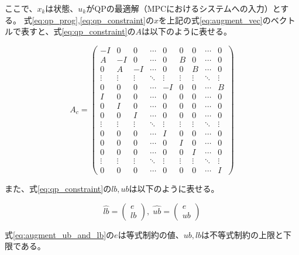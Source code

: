 ここで、$x_{k}$は状態、$u_{k}$がQPの最適解（MPCにおけるシステムへの入力）とする。
式\eqref{eq:qp_prog},\eqref{eq:qp_constraint}の$x$を上記の式\eqref{eq:augment_vec}のベクトルで表すと、式\eqref{eq:qp_constraint}の$A$は以下のように表せる。

\begin{equation}
  A_{c} =
  \left(
  \begin{array}{ccccc|cccc}
      -I & 0 & 0 & \cdots & 0 & 0 & 0 & \cdots & 0 \\ A & -I & 0 & \cdots & 0 & B & 0 & \cdots & 0 \\ 0 & A & -I & \cdots & 0 & 0 & B & \cdots & 0\\ \vdots & \vdots & \vdots & \ddots & \vdots & \vdots & \vdots & \ddots & \vdots \\ 0 & 0 & 0 & \cdots & -I & 0 & 0 & \cdots & B\\ \hline I & 0 & 0 & \cdots & 0 & 0 & 0 & \cdots & 0\\ 0 & I & 0 & \cdots & 0 & 0 & 0 & \cdots & 0\\ 0 & 0 & I & \cdots & 0 & 0 & 0 & \cdots & 0\\ \vdots & \vdots & \vdots & \ddots & \vdots & \vdots & \vdots & \ddots & \vdots \\ 0 & 0 & 0 & \cdots & I & 0 & 0 & \cdots & 0\\ 0 & 0 & 0 & \cdots & 0 & I & 0 & \cdots & 0\\ 0 & 0 & 0 & \cdots & 0 & 0 & I & \cdots & 0\\ \vdots & \vdots & \vdots & \ddots & \vdots & \vdots & \vdots & \ddots & \vdots \\ 0 & 0 & 0 & \cdots & 0 & 0 & 0 & \cdots & I
    \end{array}
  \right)
  \label{eq:mpc_constraint_matrix}
\end{equation}

また、式\eqref{eq:qp_constraint}の$lb,ub$は以下のように表せる。

\begin{equation}
  \hat{lb} =
  \begin{pmatrix}
    e \\
    lb
  \end{pmatrix},\;
  \hat{ub} =
  \begin{pmatrix}
    e \\
    ub
  \end{pmatrix}
  \label{eq:augment_ub_and_lb}
\end{equation}

式\eqref{eq:augment_ub_and_lb}の$e$は等式制約の値、$ub,lb$は不等式制約の上限と下限である。



